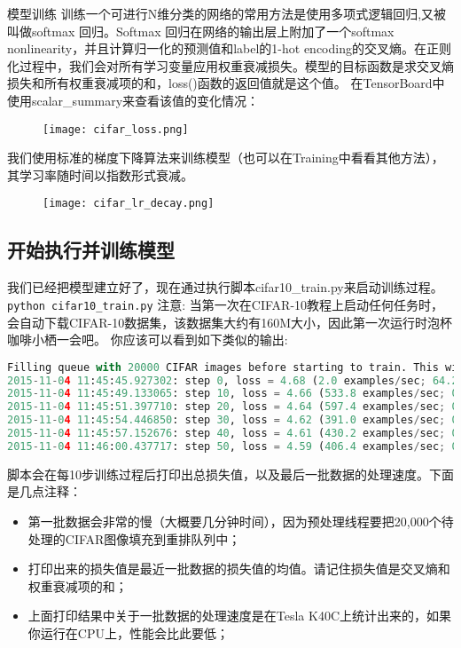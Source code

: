 模型训练
训练一个可进行N维分类的网络的常用方法是使用多项式逻辑回归,又被叫做softmax 回归。Softmax 回归在网络的输出层上附加了一个softmax nonlinearity，并且计算归一化的预测值和label的1-hot encoding的交叉熵。在正则化过程中，我们会对所有学习变量应用权重衰减损失。模型的目标函数是求交叉熵损失和所有权重衰减项的和，loss()函数的返回值就是这个值。
在TensorBoard中使用scalar\_summary来查看该值的变化情况：

\begin{figure}[H]
	\centering
	\texttt{[image: cifar\_loss.png]}
\end{figure}
我们使用标准的梯度下降算法来训练模型（也可以在Training中看看其他方法），其学习率随时间以指数形式衰减。

\begin{figure}[H]
	\centering
	\texttt{[image: cifar\_lr\_decay.png]}
\end{figure}
\subsection{开始执行并训练模型}
我们已经把模型建立好了，现在通过执行脚本cifar10\_train.py来启动训练过程。
\lstinline[language=Bash]{python cifar10_train.py}
注意: 当第一次在CIFAR-10教程上启动任何任务时，会自动下载CIFAR-10数据集，该数据集大约有160M大小，因此第一次运行时泡杯咖啡小栖一会吧。
你应该可以看到如下类似的输出:
\begin{lstlisting}[language=Python]
Filling queue with 20000 CIFAR images before starting to train. This will take a few minutes.
2015-11-04 11:45:45.927302: step 0, loss = 4.68 (2.0 examples/sec; 64.221 sec/batch)
2015-11-04 11:45:49.133065: step 10, loss = 4.66 (533.8 examples/sec; 0.240 sec/batch)
2015-11-04 11:45:51.397710: step 20, loss = 4.64 (597.4 examples/sec; 0.214 sec/batch)
2015-11-04 11:45:54.446850: step 30, loss = 4.62 (391.0 examples/sec; 0.327 sec/batch)
2015-11-04 11:45:57.152676: step 40, loss = 4.61 (430.2 examples/sec; 0.298 sec/batch)
2015-11-04 11:46:00.437717: step 50, loss = 4.59 (406.4 examples/sec; 0.315 sec/batch)
\end{lstlisting}

脚本会在每10步训练过程后打印出总损失值，以及最后一批数据的处理速度。下面是几点注释：
\begin{itemize}
	\item 第一批数据会非常的慢（大概要几分钟时间），因为预处理线程要把20,000个待处理的CIFAR图像填充到重排队列中；
	\item 打印出来的损失值是最近一批数据的损失值的均值。请记住损失值是交叉熵和权重衰减项的和；
	\item 上面打印结果中关于一批数据的处理速度是在Tesla K40C上统计出来的，如果你运行在CPU上，性能会比此要低；
\end{itemize}

